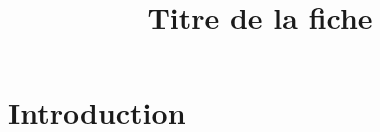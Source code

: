\documentclass[12pt]{article} %
\title{Titre de la fiche}
\date{}
\begin{document}
\maketitle
\section*{Introduction}
\end{document}
